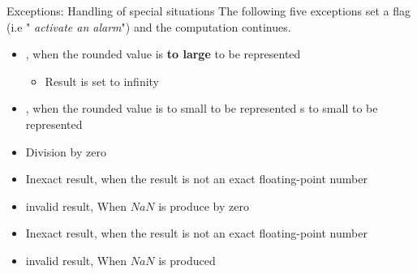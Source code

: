         \begin{parag}{Exceptions: Handling of special situations}
            The following five exceptions set a flag (i.e " \textit{activate an alarm}") and the computation continues.
            \begin{itemize}
                \item {}, when the rounded value is \textbf{to large} to be represented 
                    \begin{itemize}
                        \item Result is set to infinity
                    \end{itemize}
                \item {}, when the rounded value is to small to be represented
            s to small to be represented
        \item Division by zero
        \item Inexact result, when the result is not an exact floating-point number
        \item invalid result, When $NaN$ is produce by zero
                \item Inexact result, when the result is not an exact floating-point number
                \item invalid result, When $NaN$ is produced
            \end{itemize}
        
        \end{parag}
        
